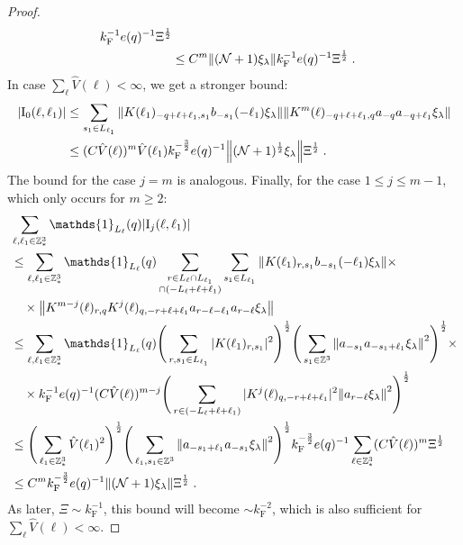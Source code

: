 \documentclass[12pt,a4paper]{article}
\numberwithin{equation}{section}
\newcommand{\1}{\mathbb{I}}
\newcommand{\F}{\mathrm{F}}
\newcommand{\I}{\mathrm{I}}
\newcommand{\Z}{\mathbb{Z}}
\newcommand{\NN}{\mathcal{N}}
\newcommand{\half}{\frac{1}{2}}
\theoremstyle{plain}
\theoremstyle{definition}
\theoremstyle{remark}
\theoremstyle{plain}
\theoremstyle{definition}
\theoremstyle{remark}
\begin{document}
\begin{proof}
\begin{align}
		k_{\F}^{-1} e(q)^{-1} \Xi^\half \nonumber\\
	&\leq C^m \norm{(\NN+1) \xi_\lambda}
		k_{\F}^{-1} e(q)^{-1} \Xi^\half \;. \label{eq:estEQ2171_Coulomb}
\end{align}
In case $ \sum_\ell \hat{V}(\ell) < \infty $, we get a stronger bound:
\begin{align}
	|\I_0(\ell, \ell_1)|
	&\leq \sum_{s_1 \in L_{\ell_1}}
		\norm{K(\ell_1)_{-q+\ell+\ell_1,s_1} b_{-s_1}(-\ell_1) \xi_\lambda}
		\norm{ K^m(\ell)_{-q+\ell+\ell_1,q}a_{-q}a_{-q+\ell_1} \xi_\lambda } \nonumber\\
	&\leq (C \hat{V}(\ell))^m
		\hat{V}(\ell_1)
		k_{\F}^{-\frac 32} e(q)^{-1}
		\norm{(\NN+1)^\half\xi_\lambda} \Xi^\half \;. \label{eq:estEQ2171}
\end{align}
The bound for the case $ j = m $ is analogous. Finally, for the case $ 1 \le j \le m-1 $, which only occurs for $ m \ge 2 $:
\begin{align}
	&\sum_{\ell,\ell_1 \in \Z^3_*} \mathds{1}_{L_\ell}(q) |\I_j(\ell, \ell_1)| \nonumber\\
	&\leq \sum_{\ell,\ell_1 \in \Z^3_*} \mathds{1}_{L_\ell}(q) \sum\limits_{\substack{r\in L_{\ell} \cap L_{\ell_1} \\ \cap (-L_{\ell}+\ell+\ell_1)}} 
		\sum\limits_{s_1\in L_{\ell_1}} 
		\norm{K(\ell_1)_{r,s_1} b_{-s_1}(-\ell_1) \xi_\lambda} \times \nonumber\\
	&\quad \times \norm{ K^{m-j}(\ell)_{r,q} K^j(\ell)_{q,-r+\ell+\ell_1} a_{r-\ell-\ell_1} a_{r-\ell} \xi_\lambda } \nonumber\\
	&\leq \sum_{\ell,\ell_1 \in \Z^3_*} \mathds{1}_{L_\ell}(q) \Bigg( \sum\limits_{r,s_1\in L_{\ell_1}} 
		|K(\ell_1)_{r,s_1}|^2 \Bigg)^{\half}
		\Bigg( \sum\limits_{s_1 \in \Z^3}
		\norm{a_{-s_1} a_{-s_1+\ell_1} \xi_\lambda}^2 \Bigg)^{\half} \times \nonumber\\
		&\quad \times k_{\F}^{-1} e(q)^{-1} (C \hat{V}(\ell))^{m-j}
		\Bigg( \sum\limits_{r\in (-L_{\ell}+\ell+\ell_1)} 
		|K^j(\ell)_{q,-r+\ell+\ell_1}|^2
		\norm{ a_{r-\ell} \xi_\lambda }^2 \Bigg)^{\half} \nonumber\\
	&\leq  \Bigg( \sum_{\ell_1 \in \Z^3_*} 
		\hat{V}(\ell_1)^2 \Bigg)^{\half}
		\Bigg( \sum\limits_{\ell_1,s_1 \in \Z^3}
		\norm{a_{-s_1+\ell_1} a_{-s_1} \xi_\lambda}^2 \Bigg)^{\half}
		k_{\F}^{-\frac 32} e(q)^{-1} \sum_{\ell \in \Z^3_*} (C \hat{V}(\ell))^m \Xi^\half \nonumber\\
	&\leq C^m k_{\F}^{-\frac 32} e(q)^{-1}
		\norm{(\NN+1) \xi_\lambda} \Xi^{\half} \;. \label{eq:estEQ2172}
\end{align}
As later, $ \Xi \sim k_{\F}^{-1} $, this bound will become $ \sim k_{\F}^{-2} $, which is also sufficient for $ \sum_\ell \hat{V}(\ell) < \infty $.
\end{proof}
\end{document}
